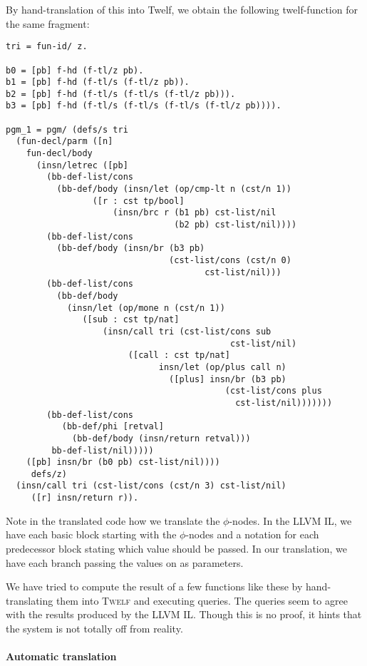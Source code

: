 \documentclass[a4paper, oneside, 10pt, final]{memoir}
\newcommand{\twelf}{\textsc{Twelf}}
\begin{document}
By hand-translation of this into Twelf, we obtain the following
twelf-function for the same fragment:
\begin{verbatim}
tri = fun-id/ z.

b0 = [pb] f-hd (f-tl/z pb).
b1 = [pb] f-hd (f-tl/s (f-tl/z pb)).
b2 = [pb] f-hd (f-tl/s (f-tl/s (f-tl/z pb))).
b3 = [pb] f-hd (f-tl/s (f-tl/s (f-tl/s (f-tl/z pb)))).

pgm_1 = pgm/ (defs/s tri
  (fun-decl/parm ([n]
    fun-decl/body
      (insn/letrec ([pb]
        (bb-def-list/cons
          (bb-def/body (insn/let (op/cmp-lt n (cst/n 1))
    		     ([r : cst tp/bool]
                     (insn/brc r (b1 pb) cst-list/nil
                                 (b2 pb) cst-list/nil))))
        (bb-def-list/cons
          (bb-def/body (insn/br (b3 pb)
                                (cst-list/cons (cst/n 0)
                                       cst-list/nil)))
        (bb-def-list/cons
          (bb-def/body
    	    (insn/let (op/mone n (cst/n 1))
    	       ([sub : cst tp/nat]
                   (insn/call tri (cst-list/cons sub
                                            cst-list/nil)
                        ([call : cst tp/nat]
                              insn/let (op/plus call n)
                                ([plus] insn/br (b3 pb)
                                           (cst-list/cons plus
                                             cst-list/nil)))))))
        (bb-def-list/cons
           (bb-def/phi [retval]
    	     (bb-def/body (insn/return retval)))
         bb-def-list/nil)))))
    ([pb] insn/br (b0 pb) cst-list/nil))))
     defs/z)
  (insn/call tri (cst-list/cons (cst/n 3) cst-list/nil)
     ([r] insn/return r)).
\end{verbatim}

Note in the translated code how we translate the $\phi$-nodes. In the
LLVM IL, we have each basic block starting with the $\phi$-nodes and a
notation for each predecessor block stating which value should be
passed. In our translation, we have each branch passing the values on
as parameters.

We have tried to compute the result of a few functions like these by
hand-translating them into \twelf{} and executing queries. The queries
seem to agree with the results produced by the LLVM IL. Though this is
no proof, it hints that the system is not totally off from reality.

\paragraph{Automatic translation}
\end{document}

